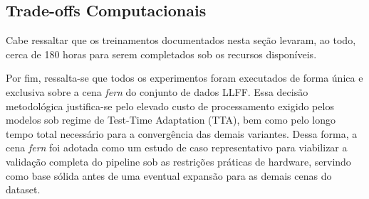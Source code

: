 \documentclass[12pt]{article}
\begin{document}
\subsection{Trade-offs Computacionais}

Cabe ressaltar que os treinamentos documentados nesta seção levaram, ao todo, cerca de 180 horas para serem completados sob os recursos disponíveis.

\begin{table}[H]
\centering
\caption{Comparativo de custo computacional e pegada de memória. O tempo de treinamento refere-se à convergência da cena (ou adaptação no caso TTA). O "Tamanho da Rede" indica o footprint estático alocado, enquanto o "Pico Torch" demonstra o pico real de memória na GPU aferido dinamicamente durante a inferência. A taxa de FPS foi medida na renderização do conjunto de teste.}
\label{tab:custo_computacional}
\end{table}

Por fim, ressalta-se que todos os experimentos foram executados de forma única e exclusiva sobre a cena \textit{fern} do conjunto de dados LLFF. Essa decisão metodológica justifica-se pelo elevado custo de processamento exigido pelos modelos sob regime de Test-Time Adaptation (TTA), bem como pelo longo tempo total necessário para a convergência das demais variantes. Dessa forma, a cena \textit{fern} foi adotada como um estudo de caso representativo para viabilizar a validação completa do pipeline sob as restrições práticas de hardware, servindo como base sólida antes de uma eventual expansão para as demais cenas do dataset.
\end{document}
